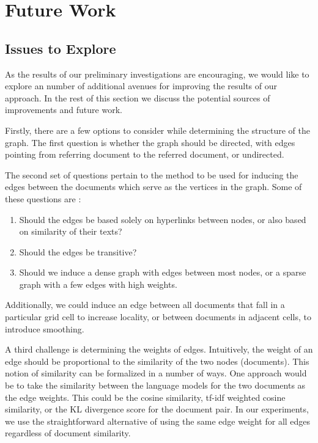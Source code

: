\section{Future Work}
\subsection{Issues to Explore}  

As the results of our preliminary investigations are encouraging, we would like to explore an number of additional avenues
for improving the results of our approach. In the rest of this section we discuss the potential sources of improvements and future work.

\par Firstly, there are a few options to consider while determining the structure of the
graph. The first question is whether the graph should be directed, with edges
pointing from referring document to the referred document, or undirected. 

\par The second set of questions pertain to the method to be used for inducing
the edges between the documents which serve as the vertices in the graph. Some of these questions are :

\begin{enumerate}
    \item Should the edges be based solely on hyperlinks between nodes, or also based on similarity of their texts?
    \item Should the edges be transitive?
    \item Should we induce a dense graph with edges between most nodes, or a sparse graph with a few edges with high weights. 
\end{enumerate}

Additionally, we could induce an edge between
all documents that fall in a particular grid cell to increase locality, or
between documents in adjacent cells, to introduce smoothing.

\par A third challenge is determining the weights of edges. Intuitively, the
weight of an edge should be proportional to the similarity of the two nodes
(documents). This notion of similarity can be formalized in a number of ways.
One approach would be to take the similarity between the language models for
the two documents as the edge weights. This could be the cosine similarity,
tf-idf weighted cosine similarity, or the KL divergence score for the document pair. 
In our experiments, we use the straightforward alternative of using the 
same edge weight for all edges regardless of document similarity.


